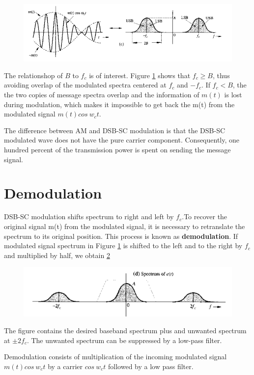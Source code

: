 \begin{figure}[h!]
  \includegraphics[width = 1.1\textwidth]{figures/DSBSC1.png}
  \caption{}
  \label{fig:DSBSC2}
\end{figure}

The relationshop of $B$ to $f_c$ is of interest. Figure \ref{fig:DSBSC2} shows that $f_c \geq B$, thus avoiding overlap of the modulated spectra centered at $f_c$ and $-f_c$. If $f_c < B$, the the two copies of message spectra overlap and the information of $m(t)$ is lost during modulation, which makes it impossible to get back the m(t) from the modulated signal $m(t)cos~w_ct$.
\par The difference between AM and DSB-SC modulation is that the DSB-SC modulated wave does not
have the pure carrier component. Consequently, one hundred percent of the transmission power is
spent on sending the message signal.

\section{Demodulation}
DSB-SC modulation shifts spectrum to right and left by $f_c$.To recover the original signal m(t) from the modulated signal, it is necessary to retranslate the spectrum to its original position. This process is known as \textbf{demodulation}.
If modulated signal spectrum in Figure \ref{fig:DSBSC2} is
shifted to the left and to the right by $f_c$ and multiplied by
half, we obtain \ref{fig:DSBSC3}

\begin{figure}[h!]
  \includegraphics[width = 1.1\textwidth]{figures/DSBSC3.png}
  \caption{}
  \label{fig:DSBSC3}
\end{figure}

The figure contains the desired baseband spectrum plus and unwanted spectrum at $\pm 2f_c$. The unwanted spectrum can be suppressed by a low-pass filter.
\par Demodulation consists of multiplication of the incoming
modulated signal $m(t)cos~w_ct$ by a carrier $cos~w_ct$ followed by a low pass filter.


